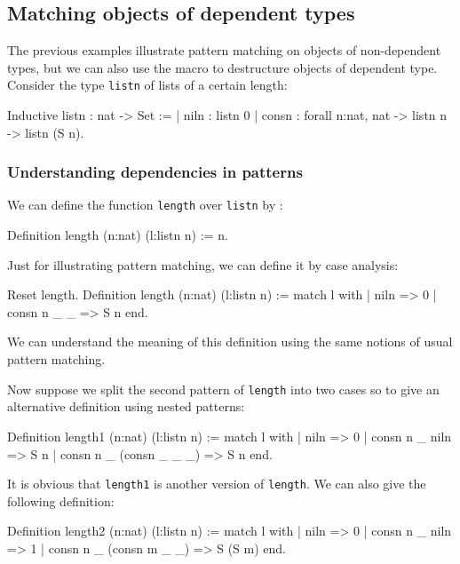 \subsection{Matching objects of dependent types}
The previous examples illustrate pattern matching on objects of
non-dependent types, but we can also 
use the macro to destructure objects of dependent type.
Consider the type \verb+listn+ of lists of a certain length:

\begin{coq_example}
Inductive listn : nat -> Set :=
  | niln : listn 0%
  | consn : forall n:nat, nat -> listn n -> listn (S n).
\end{coq_example}

\subsubsection{Understanding dependencies in patterns}
We can define the function \verb+length+ over \verb+listn+ by :

\begin{coq_example}
Definition length (n:nat) (l:listn n) := n.
\end{coq_example}

Just for illustrating pattern matching, 
we can define it by case analysis:
\begin{coq_example}
Reset length.
Definition length (n:nat) (l:listn n) :=
  match l with
  | niln => 0%
  | consn n _ _ => S n
  end.
\end{coq_example}

We can understand the meaning of this definition using the
same notions of usual pattern matching.

Now suppose we split the second pattern  of \verb+length+ into two 
cases so to give an
alternative definition using nested patterns:
\begin{coq_example}
Definition length1 (n:nat) (l:listn n) :=
  match l with
  | niln => 0%
  | consn n _ niln => S n
  | consn n _ (consn _ _ _) => S n
  end.
\end{coq_example}

It is obvious that \verb+length1+ is  another version of
\verb+length+. We can also give the following definition:
\begin{coq_example}
Definition length2 (n:nat) (l:listn n) :=
  match l with
  | niln => 0%
  | consn n _ niln => 1%
  | consn n _ (consn m _ _) => S (S m)
  end.
\end{coq_example}


